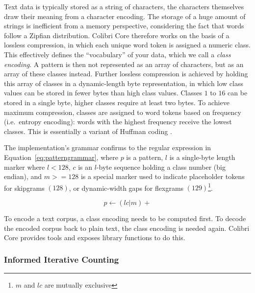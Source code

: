 \documentclass[a4paper,12pt]{article}
\begin{document}
Text data is typically stored as a string of characters, the characters
themselves draw their meaning from a character encoding. The storage of a huge
amount of strings is inefficient from a memory perspective, considering the
fact that words follow a Zipfian distribution. Colibri Core therefore works on
the basis of a lossless compression, in which each unique word token is
assigned a numeric class. This effectively defines the ``vocabulary'' of your
data, which we call a \emph{class encoding}. A pattern is then not represented
as an array of characters, but as an array of these classes instead. Further
lossless compression is achieved by holding this array of classes in a
dynamic-length byte representation, in which low class values can be stored in
fewer bytes than high class values. Classes $1$ to $16$ can be stored in a
single byte, higher classes require at least two bytes. To achieve maximum
compression, classes are assigned to word tokens based on frequency (i.e.\
entropy encoding): words with the highest frequency receive the lowest classes.
This is essentially a variant of Huffman coding \cite{HUFFMAN}.

The implementation's grammar confirms to the regular expression in
Equation~\ref{eq:patterngrammar}, where $p$ is a pattern, $l$ is a single-byte
length marker where $l<128$, $c$ is an $l$-byte sequence holding a class number
(big endian), and $m>=128$ is a special marker used to indicate placeholder
tokens for skipgrams $(128)$, or dynamic-width gaps for flexgrams
$(129)$\footnote{$m$ and $lc$ are mutually exclusive}.

\begin{equation}
\label{eq:patterngrammar}
p \leftarrow (lc|m)+
\end{equation}

To encode a text corpus, a class encoding needs to be computed first. To decode
the encoded corpus back to plain text, the class encoding is needed again.
Colibri Core provides tools and exposes library functions to do this.

\subsubsection{Informed Iterative Counting}
\end{document}

